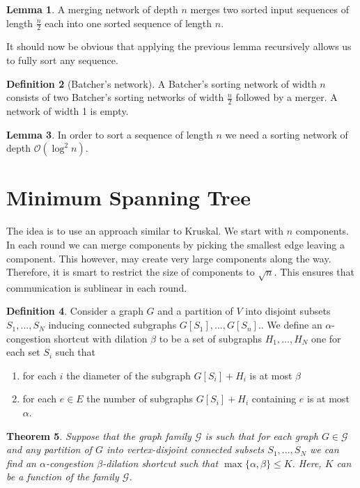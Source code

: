 \documentclass[a4paper, 12pt]{article}
\theoremstyle{plain}
\newtheorem{theorem}{Theorem}[section] %
\theoremstyle{definition}
\newtheorem{definition}[theorem]{Definition} %
\theoremstyle{lemma}
\newtheorem{lemma}[theorem]{Lemma}
\theoremstyle{remark}
\theoremstyle{corollary}
\theoremstyle{example}
\begin{document}
	\begin{lemma}
		A merging network of depth $n$ merges two sorted input sequences of length $\frac{n}{2}$ each into one sorted sequence of length $n$.
	\end{lemma}
	It should now be obvious that applying the previous lemma recursively allows us to fully sort any sequence.
	\begin{definition}[Batcher's network]
		A Batcher's sorting network of width $n$ consists of two Batcher's sorting networks of width $\frac{n}{2}$ followed by a merger. A network of width 1 is empty. 
	\end{definition}
	\begin{lemma}
		In order to sort a sequence of length $n$ we need a sorting network of depth $\mathcal{O}(\log^2 n)$.
	\end{lemma}
	\section{Minimum Spanning Tree}
	The idea is to use an approach similar to Kruskal. We start with $n$ components. In each round we can merge components by picking the smallest edge leaving a component. This however, may create very large components along the way. Therefore, it is smart to restrict the size of components to $\sqrt{n}$. This ensures that communication is sublinear in each round. 
	\begin{definition}
		Consider a graph $G$ and a partition of $V$ into disjoint subsets $S_1,...,S_N$ inducing connected subgraphs $G[S_1],...,G[S_n]$.. We define an $\alpha$-congestion shortcut with dilation $\beta$ to be a set of subgraphs $H_1,...,H_N$ one for each set $S_i$ such that \begin{enumerate}
			\item for each $i$ the diameter of the subgraph $G[S_i]+H_i$ is at most $\beta$
			\item for each $e \in E$ the number of subgraphs $G[S_i]+H_i$ containing $e$ is at most $\alpha$.
		\end{enumerate}
	\end{definition}
	\begin{theorem}
		Suppose that the graph family $\mathcal{G}$ is such that for each graph $G \in \mathcal{G}$ and any partition of $G$ into vertex-disjoint connected subsets $S_1,...,S_N$ we can find an $\alpha$-congestion $\beta$-dilation shortcut such that $\max\{\alpha,\beta\}\leq K$. Here, $K$ can be a function of the family $\mathcal{G}$. 
	\end{theorem}
\end{document}

